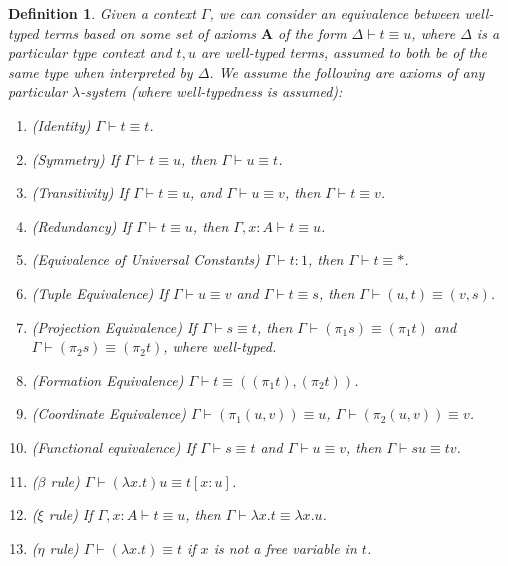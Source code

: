 \documentclass{article}
\theoremstyle{plain}
\newtheorem{definition}{Definition}
\begin{document}
\begin{definition}
    Given a context $\Gamma$, we can consider an equivalence between well-typed terms based on some set of axioms $\mathbf{A}$ of the form $\Delta \vdash t \equiv u$, where $\Delta$ is a particular type context and $t,u$ are well-typed terms, assumed to both be of the same type when interpreted by $\Delta$. We assume the following are axioms of any particular $\lambda$-system (where well-typedness is assumed):
    \begin{enumerate}
        \item(Identity) $\Gamma \vdash t \equiv t$.
        \item(Symmetry) If $\Gamma \vdash t \equiv u$, then $\Gamma \vdash u \equiv t$.
        \item(Transitivity) If $\Gamma \vdash t \equiv u$, and $\Gamma \vdash u \equiv v$, then $\Gamma \vdash t \equiv v$.
        \item(Redundancy) If $\Gamma \vdash t \equiv u$, then $\Gamma, x:A \vdash t \equiv u$.
        \item(Equivalence of Universal Constants) $\Gamma \vdash t: 1$, then $\Gamma \vdash t \equiv *$.
        \item(Tuple Equivalence) If $\Gamma \vdash u \equiv v$ and $\Gamma \vdash t \equiv s$, then $\Gamma \vdash (u,t) \equiv (v,s)$.
        \item(Projection Equivalence) If $\Gamma \vdash s \equiv t$, then $\Gamma \vdash (\pi_1 s) \equiv (\pi_1 t)$ and $\Gamma \vdash (\pi_2 s) \equiv (\pi_2 t)$, where well-typed.
        \item(Formation Equivalence) $\Gamma \vdash t \equiv ((\pi_1 t), (\pi_2 t))$.
        \item(Coordinate Equivalence) $\Gamma \vdash (\pi_1 (u,v)) \equiv u$, $\Gamma \vdash (\pi_2 (u,v)) \equiv v$.
        \item(Functional equivalence) If $\Gamma \vdash s \equiv t$ and $\Gamma \vdash u \equiv v$, then $\Gamma \vdash su \equiv tv$.
        \item($\beta$ rule) $\Gamma \vdash (\lambda x.t)u \equiv t[x:u]$.
        \item($\xi$ rule) If $\Gamma, x: A \vdash t \equiv u$, then $\Gamma \vdash \lambda x. t \equiv \lambda x. u$.
        \item($\eta$ rule) $\Gamma \vdash (\lambda x.t) \equiv t$ if $x$ is not a free variable in $t$.
    \end{enumerate}
\end{definition}
\end{document}

